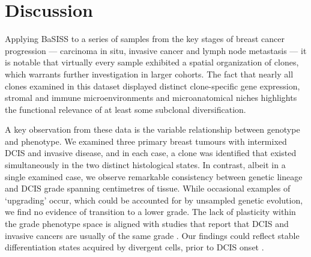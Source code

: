 \section{Discussion}
\label{sec:application-discussion}

Applying \ac{BaSISS} to a series of samples from the key stages of breast cancer progression — carcinoma in situ, invasive cancer and lymph node metastasis — it is notable that virtually every sample exhibited a spatial organization of clones, which warrants further investigation in larger cohorts. The fact that nearly all clones examined in this dataset displayed distinct clone-specific gene expression, stromal and immune microenvironments and microanatomical niches highlights the functional relevance of at least some subclonal diversification.

A key observation from these data is the variable relationship between genotype and phenotype. We examined three primary breast tumours with intermixed \ac{DCIS} and invasive disease, and in each case, a clone was identified that existed simultaneously in the two distinct histological states. In contrast, albeit in a single examined case, we observe remarkable consistency between genetic lineage and \ac{DCIS} grade spanning centimetres of tissue. While occasional examples of `upgrading' occur, which could be accounted for by unsampled genetic evolution, we find no evidence of transition to a lower grade. The lack of plasticity within the grade phenotype space is aligned with studies that report that \ac{DCIS} and invasive cancers are usually of the same grade \parencite{Gupta1997-om,Van_Luijt2016-vq}. Our findings could reflect stable differentiation states acquired by divergent cells, prior to \ac{DCIS} onset \parencite{Rakha2022-qm}.

